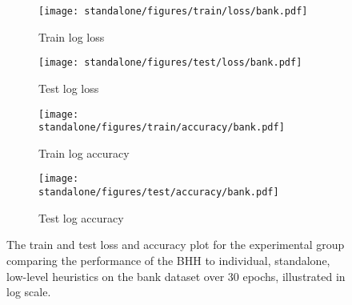 \begin{figure}[htbp]
	\begin{subfigure}{0.5\textwidth}
		\centering
		\texttt{[image: standalone/figures/train/loss/bank.pdf]}
		\caption{Train log loss}
		\label{fig:results:standalone:figures:loss:train:bank}
	\end{subfigure}
	\begin{subfigure}{0.5\textwidth}
		\centering
		\texttt{[image: standalone/figures/test/loss/bank.pdf]}
		\caption{Test log loss}
		\label{fig:results:standalone:figures:loss:test:bank}
	\end{subfigure}
	\par\bigskip
	\begin{subfigure}{0.5\textwidth}
		\centering
		\texttt{[image: standalone/figures/train/accuracy/bank.pdf]}
		\caption{Train log accuracy}
		\label{fig:results:standalone:figures:accuracy:train:bank}
	\end{subfigure}
	\begin{subfigure}{0.5\textwidth}
		\centering
		\texttt{[image: standalone/figures/test/accuracy/bank.pdf]}
		\caption{Test log accuracy}
		\label{fig:results:standalone:figures:accuracy:test:bank}
	\end{subfigure}
	\par\bigskip
	\caption{The train and test loss and accuracy plot for the experimental group comparing the performance of the \acs{BHH} to individual, standalone, low-level heuristics on the bank dataset over 30 epochs, illustrated in log scale.}
	\label{fig:results:standalone:figures:bank}
\end{figure}

